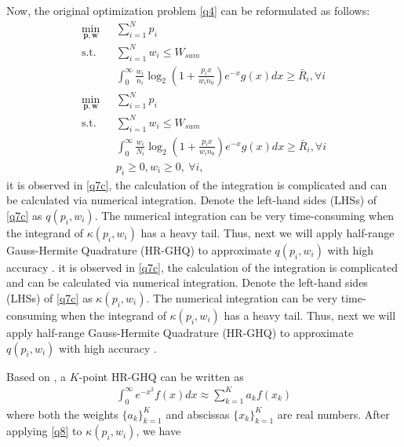 \documentclass[journal]{IEEEtran}
\begin{document}
\begin{IEEEkeywords}
Now, the original optimization problem \eqref{q4} can be reformulated as follows:
\begin{subequations}\label{q7}
	\begin{align}
	\min_{\mathbf{p}, \mathbf{w}}\ & \sum\limits_{i = 1}^{N} p_i \label{q7a} \\ \mbox{s.t.} \quad &  \sum\limits_{i = 1}^{N} w_i \leq W_{sum} \label{q7b} \\ \quad &  \int_{0}^{\infty} \frac{w_i}{n_i} \log_2\left(1 + \frac{p_i x}{w_i n_0}\right) e^{-x}g\left(x\right) dx \geq \bar{R}_i, \forall i \label{q7c}\\
	\min_{\mathbf{p}, \mathbf{w}}\ & \sum\limits_{i = 1}^{N} p_i \label{q7a} \\ \mbox{s.t.} \quad &  \sum\limits_{i = 1}^{N} w_i \leq W_{sum} \label{q7b} \\ \quad &  \int_{0}^{\infty} \frac{w_i}{N_i} \log_2\left(1 + \frac{p_i x}{w_i n_0}\right) e^{-x}g\left(x\right) dx \geq \bar{R}_i, \forall i \label{q7c}\\
	& p_i \geq 0, w_i \geq 0, \ \forall i, \label{q7d}
	\end{align}
\end{subequations}
it is observed in \eqref{q7c}, the calculation of the integration is complicated and can be calculated via numerical integration. Denote the left-hand sides (LHSs) of \eqref{q7c} as $q\left(p_i, w_i\right)$. The numerical integration can be very time-consuming when the integrand of $\kappa\left(p_i, w_i\right)$ has a heavy tail. Thus, next we will apply half-range Gauss-Hermite Quadrature (HR-GHQ) to approximate $q\left(p_i, w_i\right)$ with high accuracy \cite{JSBall,NMSteen}.
it is observed in \eqref{q7c}, the calculation of the integration is complicated and can be calculated via numerical integration. Denote the left-hand sides (LHSs) of \eqref{q7c} as $\kappa\left(p_i, w_i\right)$. The numerical integration can be very time-consuming when the integrand of $\kappa\left(p_i, w_i\right)$ has a heavy tail. Thus, next we will apply half-range Gauss-Hermite Quadrature (HR-GHQ) to approximate $q\left(p_i, w_i\right)$ with high accuracy \cite{JSBall,NMSteen}.

Based on \cite{NMSteen}, a $K$-point HR-GHQ can be written as
\begin{align} \label{q8}
\int_{0}^{\infty}e^{-x^2} f\left(x\right) dx \approx \sum\limits_{k = 1}^{K} a_k f\left(x_k\right)
\end{align}
where both the weights $\{a_k\}_{k = 1}^K$ and abscissas $\{x_k\}_{k = 1}^K$ are real numbers. After applying \eqref{q8} to $\kappa \left(p_i, w_i\right)$, we have


\end{IEEEkeywords}
\end{document}

